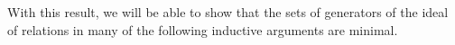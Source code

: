 \documentclass{amsart}
\theoremstyle{plain}
\newtheorem{lem}[thm]{Lemma}
\theoremstyle{definition}
\theoremstyle{remark}
\newtheorem{rem}[thm]{Remark}
\numberwithin{equation}{section}
\begin{document}
%
%
%
%
%
%

With this result, we will be able to show that the sets of generators of the ideal of relations in many of the following inductive arguments are minimal.
\end{document}
